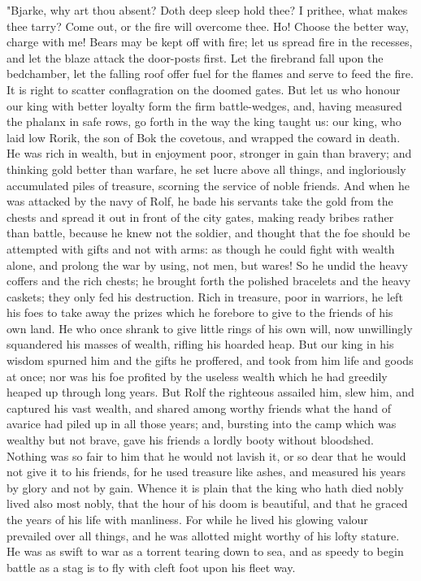 \documentclass[10pt,a4paper]{report}
\begin{document}
"Bjarke, why art thou absent? Doth deep sleep hold thee? I prithee, what makes thee tarry? Come out, or the fire will overcome thee. Ho! Choose the better way, charge with me! Bears may be kept off with fire; let us spread fire in the recesses, and let the blaze attack the door-posts first. Let the firebrand fall upon the bedchamber, let the falling roof offer fuel for the flames and serve to feed the fire. It is right to scatter conflagration on the doomed gates. But let us who honour our king with better loyalty form the firm battle-wedges, and, having measured the phalanx in safe rows, go forth in the way the king taught us: our king, who laid low Rorik, the son of Bok the covetous, and wrapped the coward in death. He was rich in wealth, but in enjoyment poor, stronger in gain than bravery; and thinking gold better than warfare, he set lucre above all things, and ingloriously accumulated piles of treasure, scorning the service of noble friends. And when he was attacked by the navy of Rolf, he bade his servants take the gold from the chests and spread it out in front of the city gates, making ready bribes rather than battle, because he knew not the soldier, and thought that the foe should be attempted with gifts and not with arms: as though he could fight with wealth alone, and prolong the war by using, not men, but wares! So he undid the heavy coffers and the rich chests; he brought forth the polished bracelets and the heavy caskets; they only fed his destruction. Rich in treasure, poor in warriors, he left his foes to take away the prizes which he forebore to give to the friends of his own land. He who once shrank to give little rings of his own will, now unwillingly squandered his masses of wealth, rifling his hoarded heap. But our king in his wisdom spurned him and the gifts he proffered, and took from him life and goods at once; nor was his foe profited by the useless wealth which he had greedily heaped up through long years. But Rolf the righteous assailed him, slew him, and captured his vast wealth, and shared among worthy friends what the hand of avarice had piled up in all those years; and, bursting into the camp which was wealthy but not brave, gave his friends a lordly booty without bloodshed. Nothing was so fair to him that he would not lavish it, or so dear that he would not give it to his friends, for he used treasure like ashes, and measured his years by glory and not by gain. Whence it is plain that the king who hath died nobly lived also most nobly, that the hour of his doom is beautiful, and that he graced the years of his life with manliness. For while he lived his glowing valour prevailed over all things, and he was allotted might worthy of his lofty stature. He was as swift to war as a torrent tearing down to sea, and as speedy to begin battle as a stag is to fly with cleft foot upon his fleet way.\\
\end{document}
